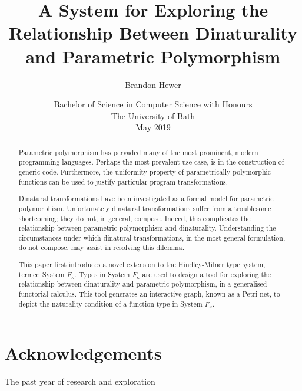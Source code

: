 \documentclass[11pt,openright,hidelinks,a4paper]{article}
\title{A System for Exploring the Relationship Between Dinaturality and Parametric Polymorphism}
\author{Brandon Hewer}
\date{Bachelor of Science in Computer Science with Honours\\The University of Bath\\May 2019}
\begin{document}
\maketitle

\newpage

\newpage


\newpage


\begin{abstract}
Parametric polymorphism has pervaded many of the most prominent, modern programming languages. Perhaps the most prevalent use case, is in the construction of generic code. Furthermore, the uniformity property of parametrically polymorphic functions can be used to justify particular program transformations.
\par 
Dinatural transformations have been investigated as a formal model for parametric polymorphism. Unfortunately dinatural transformations suffer from a troublesome shortcoming; they do not, in general, compose. Indeed, this complicates the relationship between parametric polymorphism and dinaturality. Understanding the circumstances under which dinatural transformations, in the most general formulation, do not compose, may assist in resolving this dilemma.
\par
This paper first introduces a novel extension to the Hindley-Milner type system, termed System $F_\kappa$. Types in System $F_\kappa$ are used to design a tool for exploring the relationship between dinaturality and parametric polymorphism, in a generalised functorial calculus. This tool generates an interactive graph, known as a Petri net, to depict the naturality condition of a function type in System $F_\kappa$.
\end{abstract}
\newpage


\tableofcontents
\newpage
\listoffigures

\newpage

\section*{Acknowledgements}
The past year of research and exploration 
\newpage

\setcounter{page}{1}


\newpage

\newpage

\newpage

\newpage

\newpage

\newpage

\end{document}
